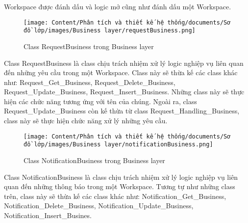 Workspace được đánh dấu và logic mở cũng như đánh dấu một Workspace.
\begin{figure}[H]
    \centering
    \texttt{[image: Content/Phân tích và thiết kế hệ thống/documents/Sơ đồ lớp/images/Business layer/requestBusiness.png]}
    \vspace{0.5cm}
    \caption{Class RequestBusiness trong Business layer}
    \label{fig:Class RequestBusiness trong Business layer}
\end{figure}
\par
Class RequestBusiness là class chịu trách nhiệm xử lý logic nghiệp vụ liên quan đến
những yêu cầu trong một Workspace. Class này sẽ thừa kế các class khác như:
Request\_Get\_Business, Request\_Delete\_Business, Request\_Update\_Business, Request\_Insert\_Business.
Những class này sẽ thực hiện các chức năng tương ứng với tên của chúng. Ngoài ra, class
Request\_Update\_Business còn kế thừa từ class Request\_Handling\_Business, class này sẽ thực
hiện chức năng xử lý những yêu cầu.
\begin{figure}[H]
    \centering
    \texttt{[image: Content/Phân tích và thiết kế hệ thống/documents/Sơ đồ lớp/images/Business layer/notificationBusiness.png]}
    \vspace{0.5cm}
    \caption{Class NotificationBusiness trong Business layer}
    \label{fig:Class NotificationBusiness trong Business layer}
\end{figure}
\par
Class NotificationBusiness là class chịu trách nhiệm xử lý logic nghiệp vụ liên quan đến
những thông báo trong một Workspace. Tương tự như những class trên, class này sẽ thừa kế các class khác như:
Notification\_Get\_Business, Notification\_Delete\_Business, Notification\_Update\_Business, Notification\_Insert\_Busines.

